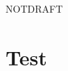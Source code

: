 \documentclass[letter,11pt,oneside]{article}
\def\documentisdraft{NOTDRAFT}
\begin{document}

\setcounter{section}{0}

\ifx\documentisdraft\drafttest
\linenumbers    %
\fi

\section{Test}





{}
\renewcommand*{\refname}{My Bibliography and References}






\end{document}
